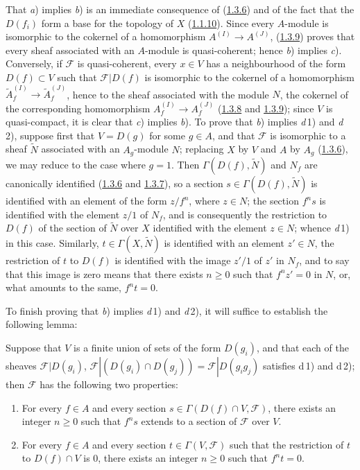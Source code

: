 That \textit{a}) implies \textit{b}) is an immediate consequence of
(\hyperref[I.1.3.6]{1.3.6}) and of the fact that the $D(f_i)$ form a base
for the topology of $X$ (\hyperref[I.1.1.10]{1.1.10}). Since every
$A$-module is isomorphic to the cokernel of a homomorphism
$A^{(I)}\to A^{(J)}$, (\hyperref[I.1.3.9]{1.3.9}) proves that every sheaf
associated with an $A$-module is quasi-coherent; hence \textit{b}) implies
\textit{c}). Conversely, if $\mathscr{F}$ is quasi-coherent, every $x\in V$
has a neighbourhood of the form $D(f)\subset V$ such that $\mathscr{F}|D(f)$
is isomorphic to the cokernel of a homomorphism
$\widetilde{A}_f^{(I)}\to\widetilde{A}_f^{(J)}$, hence to the sheaf
associated with the module $N$, the cokernel of the corresponding
homomorphism $A_f^{(I)}\to A_f^{(J)}$
(\hyperref[I.1.3.8]{1.3.8} and \hyperref[I.1.3.9]{1.3.9}); since $V$
is quasi-compact, it is clear that \textit{c}) implies \textit{b}).
To prove that \textit{b}) implies \textit{d}\,1) and \textit{d}\,2),
suppose first that $V=D(g)$ for some $g\in A$, and that $\mathscr{F}$ is
isomorphic to a sheaf $\widetilde{N}$ associated with an $A_g$-module $N$;
replacing $X$ by $V$ and $A$ by $A_g$
(\hyperref[I.1.3.6]{1.3.6}), we may reduce to the case where $g=1$. Then
$\Gamma(D(f),\widetilde{N})$ and $N_f$ are canonically identified
(\hyperref[I.1.3.6]{1.3.6} and \hyperref[I.1.3.7]{1.3.7}), so a
section $s\in\Gamma(D(f),\widetilde{N})$ is identified with an element of
the form $z/f^n$, where $z\in N$; the section $f^n s$ is identified with the
element $z/1$ of $N_f$, and is consequently the restriction to $D(f)$ of the
section of $\widetilde{N}$ over $X$ identified with the element $z\in N$;
whence \textit{d}\,1) in this case. Similarly, $t\in\Gamma(X,\widetilde{N})$
is identified with an element $z'\in N$, the restriction of $t$ to $D(f)$ is
identified with the image $z'/1$ of $z'$ in $N_f$, and to say that this image
is zero means that there exists $n\geq0$ such that $f^n z'=0$ in $N$, or,
what amounts to the same, $f^n t=0$.

To finish proving that \textit{b}) implies \textit{d}\,1) and
\textit{d}\,2), it will suffice to establish the following lemma:

\begin{lemma}[1.4.1.1]
\label{I.1.4.1.1}
Suppose that $V$ is a finite union of sets of the form $D(g_i)$, and
that each of the sheaves $\mathscr{F}|D(g_i)$,
$\mathscr{F}|(D(g_i)\cap D(g_j))=\mathscr{F}|D(g_i g_j)$ satisfies
\textup{d\,1)} and \textup{d\,2)}; then $\mathscr{F}$ has the following two
properties:
\begin{enumerate}
  \item[\textup{d'\,1)}] For every $f\in A$ and every section
  $s\in\Gamma(D(f)\cap V,\mathscr{F})$, there exists an integer $n\geq0$
  such that $f^n s$ extends to a section of $\mathscr{F}$ over $V$.
  \item[\textup{d'\,2)}] For every $f\in A$ and every section
  $t\in\Gamma(V,\mathscr{F})$ such that the restriction of $t$ to
  $D(f)\cap V$ is $0$, there exists an integer $n\geq0$ such that $f^n t=0$.
\end{enumerate}
\end{lemma}

